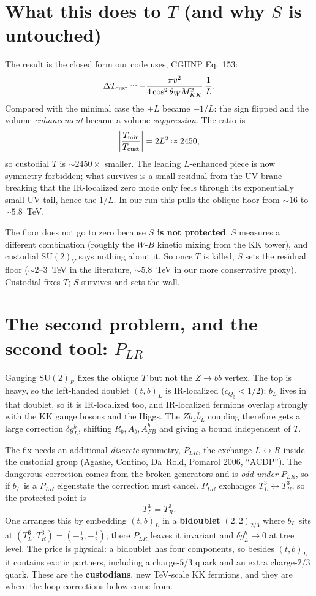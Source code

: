 \documentclass[11pt]{article}
\begin{document}
\section{What this does to $T$ (and why $S$ is untouched)}

The result is the closed form our code uses, CGHNP Eq.~153:
\[
\Delta T_{\rm cust}\simeq -\frac{\pi v^2}{4\cos^2\theta_W M_{KK}^2}\,\frac1L.
\]
Compared with the minimal case the $+L$ became $-1/L$: the sign flipped and the
volume \emph{enhancement} became a volume \emph{suppression}. The ratio is
\[
\left|\frac{T_{\min}}{T_{\rm cust}}\right| = 2L^2\approx 2450,
\]
so custodial $T$ is $\sim\!2450\times$ smaller. The leading $L$-enhanced piece is
now symmetry-forbidden; what survives is a small residual from the UV-brane breaking
that the IR-localized zero mode only feels through its exponentially small UV tail,
hence the $1/L$. In our run this pulls the oblique floor from $\sim\!16$ to
$\sim\!5.8$~TeV.

The floor does not go to zero because \textbf{$S$ is not protected}. $S$ measures a
different combination (roughly the $W$-$B$ kinetic mixing from the KK tower), and
custodial $\mathrm{SU(2)}_V$ says nothing about it. So once $T$ is killed, $S$ sets
the residual floor ($\sim\!2$--$3$~TeV in the literature, $\sim\!5.8$~TeV in our more
conservative proxy). Custodial fixes $T$; $S$ survives and sets the wall.

\section{The second problem, and the second tool: $P_{LR}$}

Gauging $\mathrm{SU(2)}_R$ fixes the oblique $T$ but not the $Z\to b\bar b$ vertex.
The top is heavy, so the left-handed doublet $(t,b)_L$ is IR-localized
($c_{Q_3}<1/2$); $b_L$ lives in that doublet, so it is IR-localized too, and
IR-localized fermions overlap strongly with the KK gauge bosons and the Higgs. The
$Z b_L\bar b_L$ coupling therefore gets a large correction $\delta g_L^b$, shifting
$R_b,A_b,A_{FB}^b$ and giving a bound independent of $T$.

The fix needs an additional \emph{discrete} symmetry, $P_{LR}$, the exchange
$L\leftrightarrow R$ inside the custodial group (Agashe, Contino, Da~Rold, Pomarol
2006, ``ACDP''). The dangerous correction comes from the broken generators and is
\emph{odd under $P_{LR}$}, so if $b_L$ is a $P_{LR}$ eigenstate the correction must
cancel. $P_{LR}$ exchanges $T^3_L\leftrightarrow T^3_R$, so the protected point is
\[
T^3_L = T^3_R.
\]
One arranges this by embedding $(t,b)_L$ in a \textbf{bidoublet} $(2,2)_{2/3}$ where
$b_L$ sits at $(T^3_L,T^3_R)=(-\tfrac12,-\tfrac12)$; there $P_{LR}$ leaves it
invariant and $\delta g_L^b\to0$ at tree level. The price is physical: a bidoublet
has four components, so besides $(t,b)_L$ it contains exotic partners, including a
charge-$5/3$ quark and an extra charge-$2/3$ quark. These are the \textbf{custodians},
new TeV-scale KK fermions, and they are where the loop corrections below come from.
\end{document}
